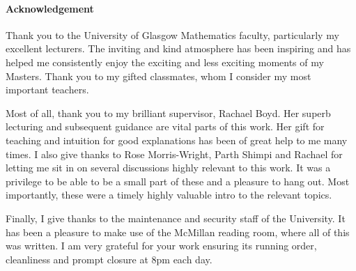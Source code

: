 \documentclass[class=article, crop=false]{standalone}
\begin{document}
\paragraph{Acknowledgement}
Thank you to the University of Glasgow Mathematics faculty, particularly my excellent lecturers. The inviting and kind atmosphere has been inspiring and has helped me consistently enjoy the exciting and less exciting moments of my Masters. Thank you to my gifted classmates, whom I consider my most important teachers.

Most of all, thank you to my brilliant supervisor, Rachael Boyd. Her superb lecturing and subsequent guidance are vital parts of this work. Her gift for teaching and intuition for good explanations has been of great help to me many times. I also give thanks to Rose Morris-Wright, Parth Shimpi and Rachael for letting me sit in on several discussions highly relevant to this work. It was a privilege to be able to be a small part of these and a pleasure to hang out. Most importantly, these were a timely highly valuable intro to the relevant topics.

Finally, I give thanks to the maintenance and security staff of the University. It has been a pleasure to make use of the McMillan reading room, where all of this was written. I am very grateful for your work ensuring its running order, cleanliness and prompt closure at 8pm each day.
\end{document}
